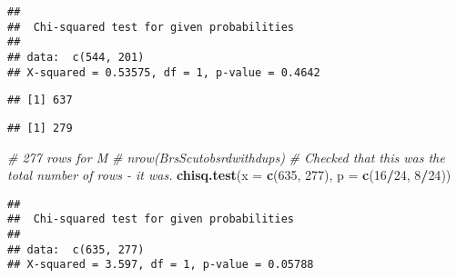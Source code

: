 \documentclass[]{article}
\newenvironment{Shaded}{\begin{snugshade}}{\end{snugshade}}
\newcommand{\CommentTok}[1]{\textcolor[rgb]{0.56,0.35,0.01}{\textit{#1}}}
\newcommand{\DataTypeTok}[1]{\textcolor[rgb]{0.13,0.29,0.53}{#1}}
\newcommand{\DecValTok}[1]{\textcolor[rgb]{0.00,0.00,0.81}{#1}}
\newcommand{\KeywordTok}[1]{\textcolor[rgb]{0.13,0.29,0.53}{\textbf{#1}}}
\newcommand{\NormalTok}[1]{#1}
\newcommand{\OperatorTok}[1]{\textcolor[rgb]{0.81,0.36,0.00}{\textbf{#1}}}
\newcommand{\StringTok}[1]{\textcolor[rgb]{0.31,0.60,0.02}{#1}}
\begin{document}
\begin{verbatim}
## 
##  Chi-squared test for given probabilities
## 
## data:  c(544, 201)
## X-squared = 0.53575, df = 1, p-value = 0.4642
\end{verbatim}

\begin{Shaded}
\end{Shaded}

\begin{verbatim}
## [1] 637
\end{verbatim}

\begin{Shaded}
\end{Shaded}

\begin{verbatim}
## [1] 279
\end{verbatim}

\begin{Shaded}
\begin{Highlighting}[]
\CommentTok{# 277 rows for M}
\CommentTok{# nrow(BrsScutobsrdwithdups)}
\CommentTok{# Checked that this was the total number of rows - it was.}
\KeywordTok{chisq.test}\NormalTok{(}\DataTypeTok{x =} \KeywordTok{c}\NormalTok{(}\DecValTok{635}\NormalTok{, }\DecValTok{277}\NormalTok{), }\DataTypeTok{p =} \KeywordTok{c}\NormalTok{(}\DecValTok{16}\OperatorTok{/}\DecValTok{24}\NormalTok{, }\DecValTok{8}\OperatorTok{/}\DecValTok{24}\NormalTok{))}
\end{Highlighting}
\end{Shaded}

\begin{verbatim}
## 
##  Chi-squared test for given probabilities
## 
## data:  c(635, 277)
## X-squared = 3.597, df = 1, p-value = 0.05788
\end{verbatim}
\end{document}
